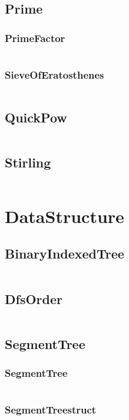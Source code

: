 \documentclass[a4paper,11pt]{article}
\begin{document}
\subsection{Prime}
\subsubsection{PrimeFactor}
\inputminted[breaklines]{c++}{M/我的模板/02++Math/+Prime/+PrimeFactor.cpp}
\subsubsection{SieveOfEratosthenes}
\inputminted[breaklines]{c++}{M/我的模板/02++Math/+Prime/+SieveOfEratosthenes.cpp}

\subsection{QuickPow}
\inputminted[breaklines]{c++}{M/我的模板/02++Math/+QuickPow.cpp}
\subsection{Stirling}
\inputminted[breaklines]{c++}{M/我的模板/02++Math/+Stirling.cpp}

\newpage
\section{DataStructure}
\subsection{BinaryIndexedTree}
\inputminted[breaklines]{c++}{M/我的模板/03++DataStructure/+BinaryIndexedTree.cpp}
\subsection{DfsOrder}
\inputminted[breaklines]{c++}{M/我的模板/03++DataStructure/+DfsOrder.cpp}
\subsection{SegmentTree}
\subsubsection{SegmentTree}
\inputminted[breaklines]{c++}{M/我的模板/03++DataStructure/+SegmentTree/+SegmentTree.cpp}
\subsubsection{SegmentTreestruct}
\inputminted[breaklines]{c++}{M/我的模板/03++DataStructure/+SegmentTree/+SegmentTreestruct.cpp}
\end{document}
